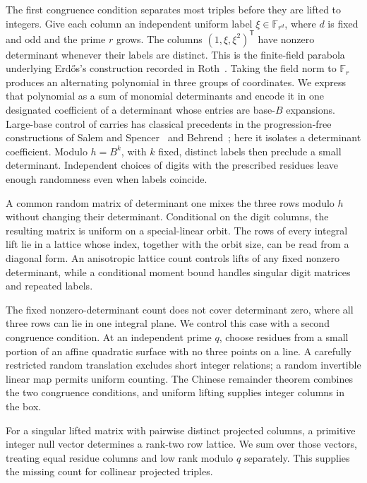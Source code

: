The first congruence condition separates most triples before they are
lifted to integers. Give each column an independent uniform label
$\xi\in\mathbb F_{r^d}$, where $d$ is fixed and odd and the prime $r$ grows.
The columns $(1,\xi,\xi^2)^{\mathsf T}$
have nonzero determinant whenever their labels are distinct. This is the
finite-field parabola underlying Erd\H{o}s's construction recorded in
Roth~\cite[Appendix]{Roth1951}. Taking the
field norm to $\mathbb F_r$ produces an alternating polynomial in three groups of
coordinates. We express that polynomial as a sum of monomial determinants
and encode it in one designated coefficient of a determinant whose entries
are base-$B$ expansions.
Large-base control of carries has classical precedents in the
progression-free constructions of Salem and Spencer~\cite{SalemSpencer1942}
and Behrend~\cite{Behrend1946}; here it isolates a determinant coefficient.
Modulo $h=B^k$, with $k$ fixed, distinct labels then preclude a small
determinant. Independent choices of digits with the prescribed residues
leave enough randomness even when labels coincide.

A common random matrix of determinant one mixes the three rows modulo
$h$ without changing their determinant. Conditional on the digit columns,
the resulting matrix is uniform on a special-linear orbit. The rows of
every integral lift lie in a lattice whose index, together with the orbit
size, can be read from a diagonal form.
An anisotropic lattice count controls lifts of any fixed nonzero
determinant, while a conditional moment bound handles singular digit
matrices and repeated labels.

The fixed nonzero-determinant count does not cover determinant zero, where
all three rows can lie in one integral plane. We control this case with a
second congruence condition. At an independent prime $q$, choose residues
from a small portion of an affine quadratic surface with no three points on a line. A carefully restricted random
translation excludes short integer relations; a random invertible linear
map permits uniform counting. The Chinese remainder theorem combines the
two congruence conditions, and uniform lifting supplies integer columns
in the box.

For a singular lifted matrix with pairwise distinct projected columns,
a primitive integer null vector determines a rank-two row lattice. We sum over those
vectors, treating equal residue columns and low rank modulo $q$
separately. This supplies the missing count for collinear projected triples.

